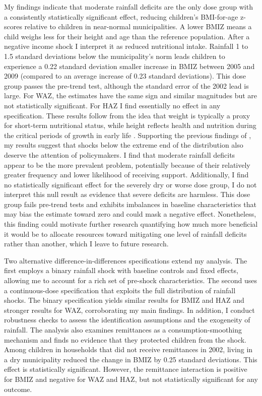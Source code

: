 \documentclass[12pt]{article}
\begin{document}
My findings indicate that moderate rainfall deficits are the only dose group with a consistently statistically significant effect, reducing children's BMI-for-age z-scores relative to children in near-normal municipalities. A lower BMIZ means a child weighs less for their height and age than the reference population. After a negative income shock I interpret it as reduced nutritional intake. Rainfall 1 to 1.5 standard deviations below the municipality's norm leads children to experience a 0.22 standard deviation smaller increase in BMIZ between 2005 and 2009 (compared to an average increase of 0.23 standard deviations). This dose group passes the pre-trend test, although the standard error of the 2002 lead is large. For WAZ, the estimates have the same sign and similar magnitudes but are not statistically significant. For HAZ I find essentially no effect in any specification. These results follow from the idea that weight is typically a proxy for short-term nutritional status, while height reflects health and nutrition during the critical periods of growth in early life \parencite{currieEarlyLifeHealthAdult2013}. Supporting the previous findings of \textcite{almondChildhoodCircumstancesAdult2018}, my results suggest that shocks below the extreme end of the distribution also deserve the attention of policymakers. I find that moderate rainfall deficits appear to be the more prevalent problem, potentially because of their relatively greater frequency and lower likelihood of receiving support. Additionally, I find no statistically significant effect for the severely dry or worse dose group, I do not interpret this null result as evidence that severe deficits are harmless. This dose group fails pre-trend tests and exhibits imbalances in baseline characteristics that may bias the estimate toward zero and could mask a negative effect. Nonetheless, this finding could motivate further research quantifying how much more beneficial it would be to allocate resources toward mitigating one level of rainfall deficits rather than another, which I leave to future research.

Two alternative difference-in-differences specifications extend my analysis. The first employs a binary rainfall shock with baseline controls and fixed effects, allowing me to account for a rich set of pre-shock characteristics. The second uses a continuous-dose specification that exploits the full distribution of rainfall shocks. The binary specification yields similar results for BMIZ and HAZ and stronger results for WAZ, corroborating my main findings. In addition, I conduct robustness checks to assess the identification assumptions and the exogeneity of rainfall. The analysis also examines remittances as a consumption-smoothing mechanism and finds no evidence that they protected children from the shock. Among children in households that did not receive remittances in 2002, living in a dry municipality reduced the change in BMIZ by 0.25 standard deviations. This effect is statistically significant. However, the remittance interaction is positive for BMIZ and negative for WAZ and HAZ, but not statistically significant for any outcome.
\end{document}
